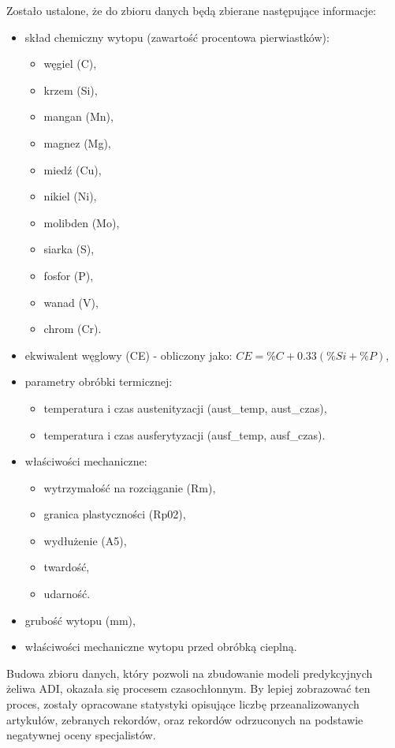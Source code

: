 Zostało ustalone, że do zbioru danych będą zbierane następujące informacje:
\begin{itemize}
    \item skład chemiczny wytopu (zawartość procentowa pierwiastków):
    \begin{itemize}
        \item węgiel (C),
        \item krzem (Si),
        \item mangan (Mn),
        \item magnez (Mg),
        \item miedź (Cu),
        \item nikiel (Ni),
        \item molibden (Mo),
        \item siarka (S),
        \item fosfor (P),
        \item wanad (V),
        \item chrom (Cr).
    \end{itemize}
    \item ekwiwalent węglowy (CE) - obliczony jako\cite{joshi2020}: $CE = \%C+0.33(\%Si+\%P)$,
    \item parametry obróbki termicznej:    
    \begin{itemize}        
        \item temperatura i czas austenityzacji (aust\_temp, aust\_czas),       
        \item temperatura i czas ausferytyzacji (ausf\_temp, ausf\_czas).  
    \end{itemize}
    \item właściwości mechaniczne:    \begin{itemize}
        \item wytrzymałość na rozciąganie (Rm),
        \item granica plastyczności (Rp02),
        \item wydłużenie (A5),
        \item twardość,
        \item udarność.
    \end{itemize}
    \item grubość wytopu (mm),
    \item właściwości mechaniczne wytopu przed obróbką cieplną.
\end{itemize}

Budowa zbioru danych, który pozwoli na zbudowanie modeli predykcyjnych żeliwa ADI, okazała się procesem czasochłonnym. By lepiej zobrazować ten proces, zostały opracowane statystyki opisujące liczbę przeanalizowanych artykułów, zebranych rekordów, oraz rekordów odrzuconych na podstawie negatywnej oceny specjalistów.

